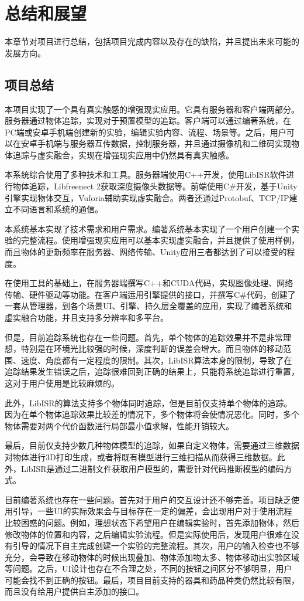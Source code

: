 \chapter{总结和展望}
\label{conclude}
本章节对项目进行总结，包括项目完成内容以及存在的缺陷，并且提出未来可能的发展方向。

\section{项目总结}
本项目实现了一个具有真实触感的增强现实应用。它具有服务器和客户端两部分。服务器通过物体追踪，实现对于预置模型的追踪。客户端可以通过编著系统，在PC端或安卓手机端创建新的实验，编辑实验内容、流程、场景等。之后，用户可以在安卓手机端与服务器互传数据，控制服务器，并且通过摄像机和二维码实现物体追踪与虚实融合，实现在增强现实应用中仍然具有真实触感。

本系统综合使用了多种技术和工具。服务器端使用C++开发，使用LibISR软件进行物体追踪，Libfreenect 2获取深度摄像头数据等。前端使用C\#开发，基于Unity引擎实现物体交互，Vuforia辅助实现虚实融合。两者还通过Protobuf、TCP/IP建立不同语言和系统的通信。

本系统基本实现了技术需求和用户需求。编著系统基本实现了一个用户创建一个实验的完整流程。使用增强现实应用可以基本实现虚实融合，并且提供了使用样例，而且物体的更新频率在服务器、网络传输、Unity应用三者都达到了可以接受的程度。

在使用工具的基础上，在服务器端撰写C++和CUDA代码，实现图像处理、网络传输、硬件驱动等功能。在客户端运用引擎提供的接口，并撰写C\#代码，创建了一套从管理器，到各个场景UI、引擎、持久层全覆盖的应用，实现了编著系统和虚实融合功能，并且支持多分辨率和多平台。

但是，目前追踪系统也存在一些问题。首先，单个物体的追踪效果并不是非常理想，特别是在环境光比较强的时候，深度判断的误差会增大。而且物体的移动范围、速度、角度都有一定程度的限制。其次，LibISR算法本身的限制，导致了在追踪结果发生错误之后，追踪很难回到正确的结果上，只能将系统追踪进行重置，这对于用户使用是比较麻烦的。

此外，LibISR的算法支持多个物体同时追踪，但是目前仅支持单个物体的追踪。因为在单个物体追踪效果比较差的情况下，多个物体将会使情况恶化。同时，多个物体需要对两个代价函数进行局部最小值求解，性能开销较大。

最后，目前仅支持少数几种物体模型的追踪，如果自定义物体，需要通过三维数据对物体进行3D打印生成，或者将既有模型进行三维扫描从而获得三维数据。此外，LibISR是通过二进制文件获取用户模型的，需要针对代码推断模型的编码方式。

目前编著系统也存在一些问题。首先对于用户的交互设计还不够完善。项目缺乏使用引导，一些UI的实际效果会与目标存在一定的偏差，会出现用户对于使用流程比较困惑的问题。例如，理想状态下希望用户在编辑实验时，首先添加物体，然后修改物体的位置和内容，之后编辑实验流程。但是实际使用后，发现用户很难在没有引导的情况下自主完成创建一个实验的完整流程。其次，用户的输入检查也不够充分，会导致在移动物体的时候出现叠加、物体添加物太多、物体移动出实验区域等问题。之后，UI设计也存在不合理之处，不同的按钮之间区分不够明显，用户可能会找不到正确的按钮。最后，项目目前支持的器具和药品种类仍然比较有限，而且没有给用户提供自主添加的接口。

